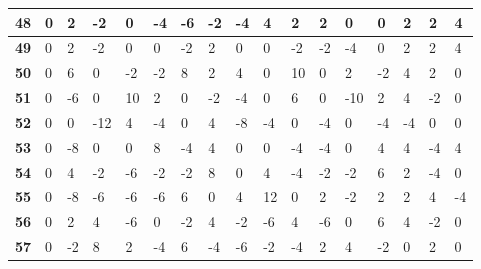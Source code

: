\begin{longtable}[c]{|l|l|l|l|l|l|l|l|l|l|l|l|l|l|l|l|l|}
\textbf{48} & 0          & 2          & -2         & 0          & -4         & -6         & -2         & -4         & 4          & 2          & 2           & 0           & 0           & 2           & 2           & 4           \\ \hline
\textbf{49} & 0          & 2          & -2         & 0          & 0          & -2         & 2          & 0          & 0          & -2         & -2          & -4          & 0           & 2           & 2           & 4           \\ \hline
\textbf{50} & 0          & 6          & 0          & -2         & -2         & 8          & 2          & 4          & 0          & 10         & 0           & 2           & -2          & 4           & 2           & 0           \\ \hline
\textbf{51} & 0          & -6         & 0          & 10         & 2          & 0          & -2         & -4         & 0          & 6          & 0           & -10         & 2           & 4           & -2          & 0           \\ \hline
\textbf{52} & 0          & 0          & -12        & 4          & -4         & 0          & 4          & -8         & -4         & 0          & -4          & 0           & -4          & -4          & 0           & 0           \\ \hline
\textbf{53} & 0          & -8         & 0          & 0          & 8          & -4         & 4          & 0          & 0          & -4         & -4          & 0           & 4           & 4           & -4          & 4           \\ \hline
\textbf{54} & 0          & 4          & -2         & -6         & -2         & -2         & 8          & 0          & 4          & -4         & -2          & -2          & 6           & 2           & -4          & 0           \\ \hline
\textbf{55} & 0          & -8         & -6         & -6         & -6         & 6          & 0          & 4          & 12         & 0          & 2           & -2          & 2           & 2           & 4           & -4          \\ \hline
\textbf{56} & 0          & 2          & 4          & -6         & 0          & -2         & 4          & -2         & -6         & 4          & -6          & 0           & 6           & 4           & -2          & 0           \\ \hline
\textbf{57} & 0          & -2         & 8          & 2          & -4         & 6          & -4         & -6         & -2         & -4         & 2           & 4           & -2          & 0           & 2           & 0           \\ \hline

\end{longtable}
